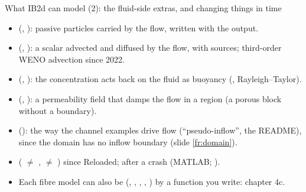 \documentclass[aspectratio=169,11pt]{beamer}
\begin{document}
\begin{frame}{What IB2d can model (2): the fluid-side extras, and changing things in time}
\label{fr:models2}
\small
\begin{itemize}
  \item {} (, ): passive particles carried by the flow, written with the output.
  \item {} (, ): a scalar advected and diffused by the flow, with sources; third-order WENO advection since 2022.
  \item {} (, ): the concentration acts back on the fluid as buoyancy (, Rayleigh--Taylor).
  \item {} (, ): a permeability field that damps the flow in a region (a porous block without a boundary).
  \item {} (): the way the channel examples drive flow (``pseudo-inflow'', the README), since the domain has no inflow boundary (slide \ref{fr:domain}).
  \item {} ( $\ne$ ,  $\ne$ ) since Reloaded;  after a crash (MATLAB; ).
  \item Each fibre model can also be  (, , , , ) by a function you write: chapter 4c.
\end{itemize}
\end{frame}
\end{document}
